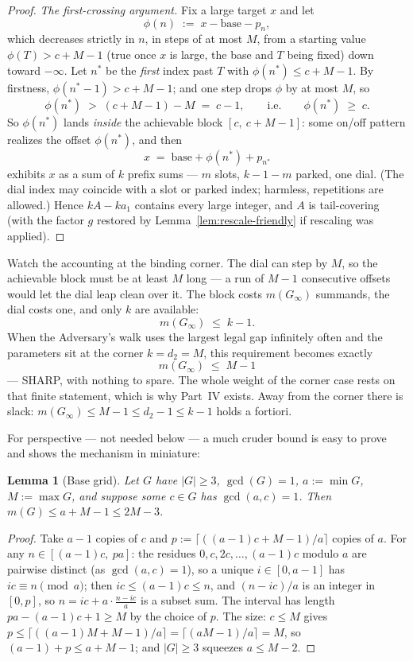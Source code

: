 \documentclass[11pt,reqno]{amsart}
\theoremstyle{plain}
\newtheorem{lemma}[theorem]{Lemma}
\theoremstyle{definition}
\theoremstyle{remark}
\newcommand{\Ginf}{G_\infty}
\begin{document}
\begin{proof}
\emph{The first-crossing argument.} Fix a large target $x$ and let
\[
  \phi(n) \;:=\; x - \mathrm{base} - p_n ,
\]
which decreases strictly in $n$, in steps of at most $M$, from a starting value
$\phi(T) > c + M - 1$ (true once $x$ is large, the base and $T$ being fixed) down
toward $-\infty$. Let $n^*$ be the \emph{first} index past $T$ with $\phi(n^*) \le
c + M - 1$. By firstness, $\phi(n^* - 1) > c + M - 1$; and one step drops $\phi$ by
at most $M$, so
\[
  \phi(n^*) \;>\; (c + M - 1) - M \;=\; c - 1, \qquad\text{i.e.}\qquad \phi(n^*)
  \;\ge\; c .
\]
So $\phi(n^*)$ lands \emph{inside} the achievable block $[c,\ c+M-1]$: some on/off
pattern realizes the offset $\phi(n^*)$, and then
\[
  x \;=\; \mathrm{base} + \phi(n^*) + p_{n^*}
\]
exhibits $x$ as a sum of $k$ prefix sums --- $m$ slots, $k-1-m$ parked, one dial.
(The dial index may coincide with a slot or parked index; harmless, repetitions
are allowed.) Hence $kA - k a_1$ contains every large integer, and $A$ is
tail-covering (with the factor $g$ restored by Lemma~\ref{lem:rescale-friendly} if
rescaling was applied).
\end{proof}

Watch the accounting at the binding corner. The dial can step by $M$, so the
achievable block must be at least $M$ long --- a run of $M - 1$ consecutive offsets
would let the dial leap clean over it. The block costs $m(\Ginf)$ summands, the
dial costs one, and only $k$ are available:
\[
  m(\Ginf) \;\le\; k - 1 .
\]
When the Adversary's walk uses the largest legal gap infinitely often and the
parameters sit at the corner $k = d_2 = M$, this requirement becomes exactly
\[
  m(\Ginf) \;\le\; M - 1
\]
--- SHARP, with nothing to spare. The whole weight of the corner case rests on
that finite statement, which is why Part~IV exists. Away from the corner there is
slack: $m(\Ginf) \le M - 1 \le d_2 - 1 \le k - 1$ holds a fortiori.

For perspective --- not needed below --- a much cruder bound is easy to prove and
shows the mechanism in miniature:

\begin{lemma}[Base grid]\label{lem:basegrid}
Let $G$ have $|G| \ge 3$, $\gcd(G) = 1$, $a := \min G$, $M := \max G$, and suppose
some $c \in G$ has $\gcd(a, c) = 1$. Then $m(G) \le a + M - 1 \le 2M - 3$.
\end{lemma}

\begin{proof}
Take $a - 1$ copies of $c$ and $p := \lceil ((a-1)c + M - 1)/a \rceil$ copies of
$a$. For any $n \in [(a-1)c,\ pa]$: the residues $0, c, 2c, \dots, (a-1)c$ modulo
$a$ are pairwise distinct (as $\gcd(a,c)=1$), so a unique $i \in [0, a-1]$ has
$ic \equiv n \pmod a$; then $ic \le (a-1)c \le n$, and $(n - ic)/a$ is an integer
in $[0, p]$, so $n = ic + a \cdot \frac{n-ic}{a}$ is a subset sum. The interval
has length $pa - (a-1)c + 1 \ge M$ by the choice of $p$. The size: $c \le M$ gives
$p \le \lceil ((a-1)M + M - 1)/a \rceil = \lceil (aM-1)/a \rceil = M$, so
$(a-1) + p \le a + M - 1$; and $|G| \ge 3$ squeezes $a \le M - 2$.
\end{proof}
\end{document}
